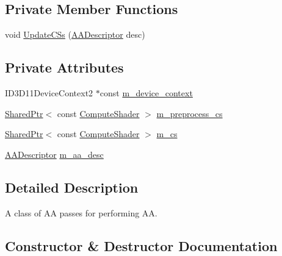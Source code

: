 \subsection*{Private Member Functions}
\begin{DoxyCompactItemize}
\item 
void \hyperlink{classmage_1_1_a_a_pass_ac48a68cdacf75cdf339e8f009e0c2bad}{Update\+C\+Ss} (\hyperlink{namespacemage_a86cd40b8f2f42ca4d616cc6ec665a7f2}{A\+A\+Descriptor} desc)
\end{DoxyCompactItemize}
\subsection*{Private Attributes}
\begin{DoxyCompactItemize}
\item 
I\+D3\+D11\+Device\+Context2 $\ast$const \hyperlink{classmage_1_1_a_a_pass_a5bd4d23f46116244fc48e3b785983c0b}{m\+\_\+device\+\_\+context}
\item 
\hyperlink{namespacemage_a1e01ae66713838a7a67d30e44c67703e}{Shared\+Ptr}$<$ const \hyperlink{namespacemage_ae040329401484b076f0cd1a7c43d19c9}{Compute\+Shader} $>$ \hyperlink{classmage_1_1_a_a_pass_a9b8a50f0e4b21ae3f558cb010acfa3b1}{m\+\_\+preprocess\+\_\+cs}
\item 
\hyperlink{namespacemage_a1e01ae66713838a7a67d30e44c67703e}{Shared\+Ptr}$<$ const \hyperlink{namespacemage_ae040329401484b076f0cd1a7c43d19c9}{Compute\+Shader} $>$ \hyperlink{classmage_1_1_a_a_pass_aca04ca410ab5c0d1cd4270f2c7ccfe1c}{m\+\_\+cs}
\item 
\hyperlink{namespacemage_a86cd40b8f2f42ca4d616cc6ec665a7f2}{A\+A\+Descriptor} \hyperlink{classmage_1_1_a_a_pass_a2c821aa79093054a95debe6540abd58c}{m\+\_\+aa\+\_\+desc}
\end{DoxyCompactItemize}


\subsection{Detailed Description}
A class of AA passes for performing AA. 

\subsection{Constructor \& Destructor Documentation}
\hypertarget{classmage_1_1_a_a_pass_a252ae39e2a24d3c82294aa9f308877b1}{}\label{classmage_1_1_a_a_pass_a252ae39e2a24d3c82294aa9f308877b1} 
